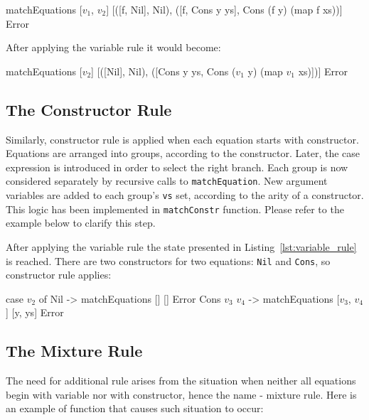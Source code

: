 \documentclass[12pt,a4paper]{report}
\begin{document}
\vspace*{0.2in}
\begin{code}[style=haskell,mathescape=true]
  matchEquations [$v_{1}$, $v_{2}$]
                 [([f, Nil], Nil),
                  ([f, Cons y ys], Cons (f y) (map f xs))]
                 Error
\end{code}

After applying the variable rule it would become:

\vspace*{0.2in}
\begin{code}[style=haskell,label=lst:variable_rule, caption={State after applying
  variable rule.}, mathescape=true]
  matchEquations [$v_{2}$]
                 [([Nil], Nil),
                  ([Cons y ys, Cons ($v_{1}$ y) (map $v_{1}$ xs)])]
                 Error
\end{code}

\subsection{The Constructor Rule}
\label{sec:constructor_rule}
Similarly, constructor rule is applied when each equation starts with
constructor. Equations are arranged into groups, according to the constructor.
Later, the case expression is introduced in order to select the right branch.
Each group is now considered separately by recursive calls to
\texttt{matchEquation}. New argument variables are added to each group's
\texttt{vs} set, according to the arity of a constructor. This logic has
been implemented in \texttt{matchConstr} function. Please refer to the example
below to clarify this step.

After applying the variable rule the state presented in
Listing~\ref{lst:variable_rule} is reached. There are two constructors for two
equations: \texttt{Nil} and \texttt{Cons}, so constructor rule applies:

\vspace*{0.2in}
\begin{code}[style=haskell,label=lst:constructor_rule, caption={State after applying
  constructor rule.}, mathescape=true]
  case $v_{2}$ of
      Nil       -> matchEquations []
                                  []
                                  Error
      Cons $v_{3}$ $v_{4}$ -> matchEquations [$v_{3}$, $v_{4}$]
                                  [y, ys]
                                  Error
\end{code}

\subsection{The Mixture Rule}
The need for additional rule arises from the situation when neither all
equations begin with variable nor with constructor, hence the name - mixture
rule. Here is an example of function that causes such situation to occur:
\end{document}
